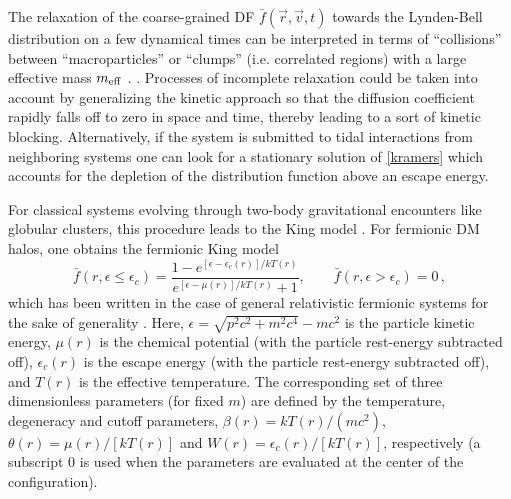 The relaxation of the coarse-grained DF $\bar{f}({\vec r},{\vec v},t)$ towards the Lynden-Bell distribution on a few dynamical times can be interpreted in terms of ``collisions'' between  ``macroparticles'' or ``clumps'' (i.e. correlated regions) with a large effective mass $m_{\rm
eff}$ \citep{1970PhRvL..25.1155K}.  . Processes of incomplete relaxation could be taken into account by generalizing the kinetic approach so that the diffusion coefficient rapidly falls off to zero in space and time, thereby leading to a sort of kinetic blocking. Alternatively, if the system is submitted to tidal interactions from neighboring systems one can look for a stationary solution of \cref{kramers} which accounts for the depletion of the distribution function above an escape energy.

For classical systems evolving through two-body gravitational encounters like globular clusters, this procedure leads to the King model \citep{1962AJ.....67..471K}. For fermionic DM halos, one obtains the fermionic King model \citep{1983A&A...119...35R,1998MNRAS.300..981C} 
%
\begin{equation}
    \bar{f}(r,\epsilon\leq\epsilon_c) = \frac{1-e^{[\epsilon-\epsilon_c(r)]/kT(r)}}{e^{[\epsilon-\mu(r)]/kT(r)}+1}, \qquad \bar{f}(r,\epsilon>\epsilon_c)=0\, ,
    \label{fcDF}
\end{equation} 
%
which has been written in the case of general relativistic fermionic systems for the sake of generality \citep{2018PDU....21...82A,2022IJMPD..3130002A}. Here, $\epsilon=\sqrt{p^2c^2 + m^2 c^4} - mc^2$ is the particle kinetic energy, $\mu(r)$ is the chemical potential (with the particle rest-energy subtracted off), $\epsilon_c(r)$ is the escape energy (with the particle rest-energy subtracted off), and $T(r)$ is the effective temperature. The corresponding set of three dimensionless parameters (for fixed $m$) are defined by the temperature, degeneracy and cutoff parameters, $\beta(r)=k T(r)/(m c^2)$, $\theta(r)=\mu(r)/[k T(r)]$ and $W(r)=\epsilon_c(r)/[k T(r)]$, respectively (a subscript $0$ is used when the parameters are evaluated at the center of the configuration).

